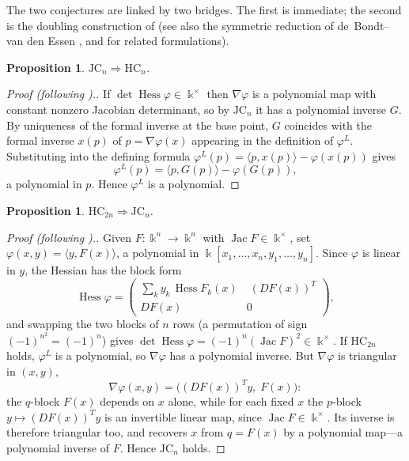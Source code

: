 \documentclass[11pt]{article}
\theoremstyle{plain}
\newtheorem{proposition}[theorem]{Proposition}
\theoremstyle{definition}
\newcommand{\kk}{\Bbbk}
\newcommand{\JC}{\mathrm{JC}}
\newcommand{\HC}{\mathrm{HC}}
\newcommand{\Hess}{\operatorname{Hess}}
\newcommand{\Jac}{\operatorname{Jac}}
\begin{document}
The two conjectures are linked by two bridges. The first is immediate;
the second is the doubling construction of \cite{Meng2006} (see also
the symmetric reduction of de~Bondt--van den Essen
\cite{deBondtvandenEssen2005}, and \cite{Zhao2007} for related
formulations).

\begin{proposition}\label{prop:JCtoHC}
$\JC_n \Longrightarrow \HC_n$.
\end{proposition}

\begin{proof}[Proof (following \cite{Meng2006}).]
If $\det\Hess\varphi\in\kk^{\times}$ then $\nabla\varphi$ is a
polynomial map with constant nonzero Jacobian determinant, so by
$\JC_n$ it has a polynomial inverse $G$. By uniqueness of the formal
inverse at the base point, $G$ coincides with the formal inverse
$x(p)$ of $p=\nabla\varphi(x)$ appearing in the definition of
$\varphi^{L}$. Substituting into the defining formula
$\varphi^{L}(p)=\langle p,x(p)\rangle-\varphi(x(p))$ gives
\[
\varphi^{L}(p)=\langle p,G(p)\rangle-\varphi(G(p)),
\]
a polynomial in $p$. Hence $\varphi^{L}$ is a polynomial.
\end{proof}

\begin{proposition}\label{prop:HCtoJC}
$\HC_{2n} \Longrightarrow \JC_n$.
\end{proposition}

\begin{proof}[Proof (following \cite{Meng2006}).]
Given $F\colon\kk^n\to\kk^n$ with $\Jac F\in\kk^{\times}$, set
$\varphi(x,y)=\langle y,F(x)\rangle$, a polynomial in
$\kk[x_1,\dots,x_n,y_1,\dots,y_n]$.
Since $\varphi$ is linear in $y$, the Hessian has the block form
\begin{equation}\label{eq:block}
\Hess\varphi=
\begin{pmatrix}
\sum_k y_k\,\Hess F_k(x) & \;(DF(x))^{T}\\[2pt]
DF(x) & 0
\end{pmatrix},
\end{equation}
and swapping the two blocks of $n$ rows (a permutation of sign
$(-1)^{n^2}=(-1)^n$) gives
$\det\Hess\varphi=(-1)^n(\Jac F)^2\in\kk^{\times}$. If $\HC_{2n}$
holds, $\varphi^{L}$ is a polynomial, so $\nabla\varphi$ has a
polynomial inverse. But $\nabla\varphi$ is triangular in $(x,y)$,
\[
\nabla\varphi(x,y)=\bigl((DF(x))^{T}y,\;F(x)\bigr):
\]
the $q$-block $F(x)$ depends on $x$ alone, while for each fixed $x$ the
$p$-block $y\mapsto(DF(x))^{T}y$ is an invertible linear map, since
$\Jac F\in\kk^{\times}$. Its inverse is therefore triangular too, and
recovers $x$ from $q=F(x)$ by a polynomial map---a polynomial inverse of
$F$. Hence $\JC_n$ holds.
\end{proof}
\end{document}
